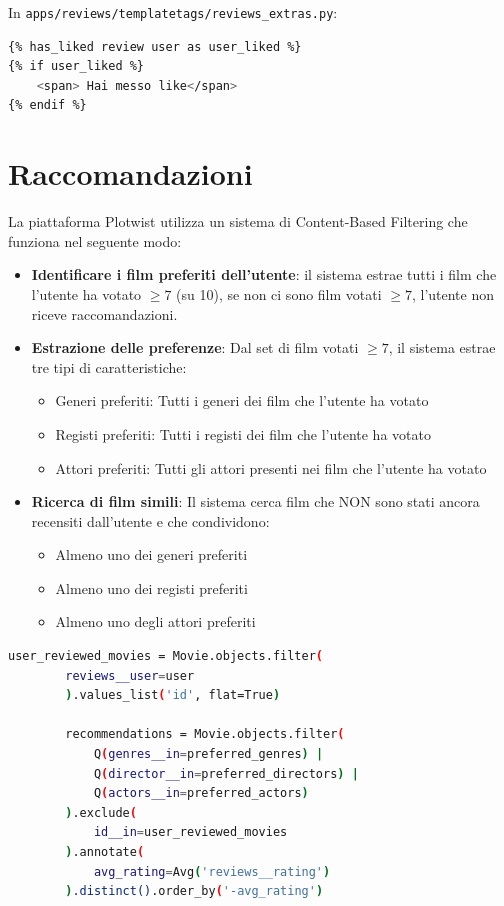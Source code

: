 \documentclass[12pt,a4paper]{report}
\begin{document}
In \texttt{apps/reviews/templatetags/reviews\_extras.py}:

\begin{lstlisting}[language=bash]
{% has_liked review user as user_liked %}
{% if user_liked %}
    <span> Hai messo like</span>
{% endif %}
\end{lstlisting}



\section{Raccomandazioni}

La piattaforma Plotwist utilizza un sistema di Content-Based Filtering che funziona nel seguente modo:

\begin{itemize}
    \item \textbf{Identificare i film preferiti dell'utente}: 
    il sistema estrae tutti i film che l'utente ha votato $\geq 7$ (su 10),
    se non ci sono film votati $\geq 7$, l'utente non riceve raccomandazioni.
    \item \textbf{Estrazione delle preferenze}: Dal set di film votati $\geq 7$, il sistema estrae tre tipi di caratteristiche:
    \begin{itemize}
        \item Generi preferiti: Tutti i generi dei film che l'utente ha votato
        \item Registi preferiti: Tutti i registi dei film che l'utente ha votato
        \item Attori preferiti: Tutti gli attori presenti nei film che l'utente ha votato
    \end{itemize}
    \item \textbf{Ricerca di film simili}: Il sistema cerca film che NON sono stati ancora recensiti dall'utente e che condividono:
    \begin{itemize}
        \item Almeno uno dei generi preferiti
        \item Almeno uno dei registi preferiti
        \item Almeno uno degli attori preferiti
    \end{itemize}
\end{itemize}

\begin{lstlisting}[language=bash]
user_reviewed_movies = Movie.objects.filter(
        reviews__user=user
        ).values_list('id', flat=True)

        recommendations = Movie.objects.filter(
            Q(genres__in=preferred_genres) |
            Q(director__in=preferred_directors) |
            Q(actors__in=preferred_actors)
        ).exclude(
            id__in=user_reviewed_movies
        ).annotate(
            avg_rating=Avg('reviews__rating')
        ).distinct().order_by('-avg_rating')
\end{lstlisting}
\end{document}

